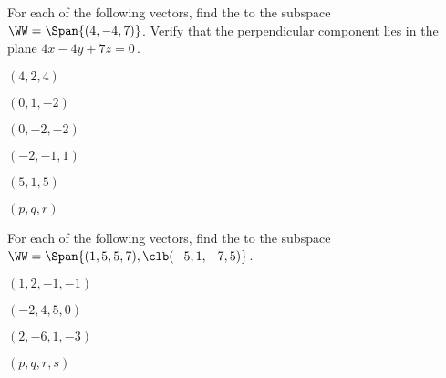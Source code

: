 \begin{exercise} \label{ex:} 
For each of the following vectors, find the  to the subspace \(\WW=\Span\{(4,-4,7)\}\).  
Verify that the perpendicular component lies in the plane \(4x-4y+7z=0\)\,.
\begin{parts}
\item \((4,2,4)\)

\item \((0,1,-2)\)

\item \((0,-2,-2)\)

\item \((-2,-1,1)\)

\item \((5,1,5)\)

\item \((p,q,r)\)

\end{parts}
\end{exercise}




\begin{exercise} \label{ex:} 
For each of the following vectors, find the  to the subspace \(\WW=\Span\{(1,5,5,7),\clb (-5,1,-7,5)\}\).  

\begin{parts}
\item \((1,2,-1,-1)\)

\item \((-2,4,5,0)\)

\item \((2,-6,1,-3)\)

\item \((p,q,r,s)\)

\end{parts}
\end{exercise}




